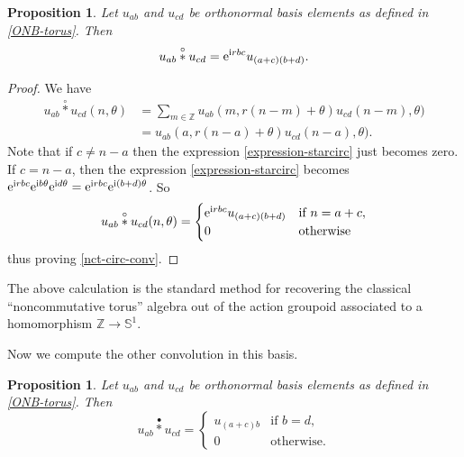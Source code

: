 \documentclass[pdftex]{sigma}
\numberwithin{equation}{section}
\newtheorem{Proposition}[Theorem]{Proposition}
\theoremstyle{definition}
\newcommand{\BBZ}{\mathbb{Z}}
\newcommand{\BBS}{\mathbb{S}}
\newcommand{\stardot}{\overset{{\bullet}}{*}}
\newcommand{\starcirc}{\overset{\circ}{*}}
\begin{document}
\begin{Proposition}\label{prop:nct.circ.calculation} Let $u_{ab}$ and $u_{cd}$ be orthonormal basis elements as defined in {\rm\eqref{ONB-torus}}. Then
\begin{equation}\label{nct-circ-conv}
u_{ab}\starcirc u_{cd}={\rm e}^{{\rm i} r bc} u_{(a+c)(b+d)}.
\end{equation}
\end{Proposition}

\begin{proof}
We have
\begin{align}
   u_{ab}\starcirc u_{cd}(n,\theta) & = \sum_{m\in \BBZ} u_{ab}(m,r(n-m)+\theta)u_{cd}(n-m),\theta)\nonumber\\
  & = u_{ab}(a,r(n-a)+\theta)u_{cd}(n-a),\theta).\label{expression-starcirc}
\end{align}
Note that if $c\neq n-a$ then the expression \eqref{expression-starcirc} just becomes zero. If $c=n-a$, then the expression \eqref{expression-starcirc} becomes
$
{\rm e}^{{\rm i}rbc}{\rm e}^{{\rm i} b\theta}{\rm e}^{{\rm i} d\theta}={\rm e}^{{\rm i} rbc} {\rm e}^{{\rm i}(b+d)\theta}$.
So
\[
u_{ab}\starcirc u_{cd}(n,\theta)=\begin{cases} {\rm e}^{{\rm i} rbc} u_{(a+c)(b+d)} & \text{if } n=a+c,\\
0 & \text{otherwise}
\end{cases}
\]
thus proving \eqref{nct-circ-conv}.
\end{proof}

The above calculation is the standard method for recovering the classical ``noncommutative torus'' algebra out of the action groupoid associated to a homomorphism $ \BBZ \to \BBS^1 $.

Now we compute the other convolution in this basis.
\begin{Proposition} Let $u_{ab}$ and $u_{cd}$ be orthonormal basis elements as defined in \eqref{ONB-torus}. Then
\begin{equation*}\label{nct-dot-conv}
u_{ab}\stardot u_{cd}=\begin{cases} u_{(a+c)b} & \text{if } b=d,\\
0 & \text{otherwise}.
\end{cases}
\end{equation*}
\end{Proposition}
\end{document}
